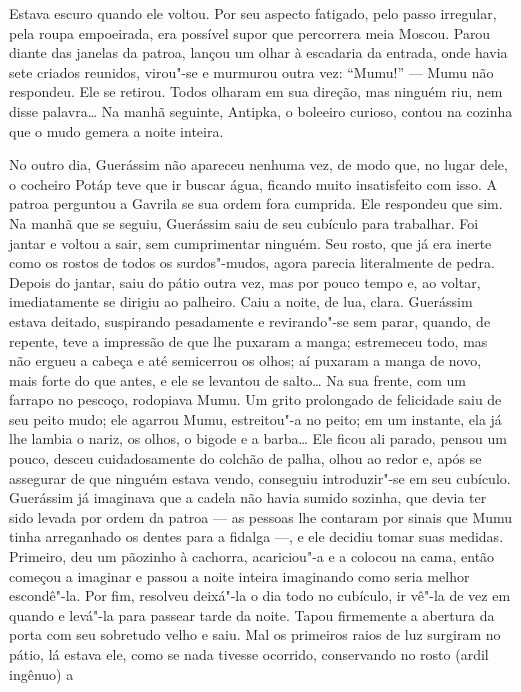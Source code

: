 Estava escuro quando ele voltou. Por seu aspecto fatigado, pelo passo
irregular, pela roupa empoeirada, era possível supor que percorrera meia
Moscou. Parou diante das janelas da patroa, lançou um olhar à escadaria
da entrada, onde havia sete criados reunidos, virou"-se e murmurou outra
vez: ``Mumu!'' --- Mumu não respondeu. Ele se retirou. Todos olharam em
sua direção, mas ninguém riu, nem disse palavra\ldots{} Na manhã seguinte,
Antipka, o boleeiro curioso, contou na cozinha que o mudo gemera a noite
inteira.

No outro dia, Guerássim não apareceu nenhuma vez, de modo que, no lugar
dele, o cocheiro Potáp teve que ir buscar água, ficando muito
insatisfeito com isso. A patroa perguntou a Gavrila se sua ordem fora
cumprida. Ele respondeu que sim. Na manhã que se seguiu, Guerássim saiu
de seu cubículo para trabalhar. Foi jantar e voltou a sair, sem
cumprimentar ninguém. Seu rosto, que já era inerte como os rostos de todos os
surdos"-mudos, agora parecia literalmente de pedra. Depois do jantar,
saiu do pátio outra vez, mas por pouco tempo e, ao voltar, imediatamente
se dirigiu ao palheiro. Caiu a noite, de lua, clara. Guerássim estava
deitado, suspirando pesadamente e revirando"-se sem parar, quando, de
repente, teve a impressão de que lhe puxaram a manga; estremeceu todo,
mas não ergueu a cabeça e até semicerrou os olhos; aí puxaram a manga de novo,
mais forte do que antes, e ele se levantou de salto\ldots{} Na sua frente,
com um farrapo no pescoço, rodopiava Mumu. Um grito prolongado de
felicidade saiu de seu peito mudo; ele agarrou Mumu, estreitou"-a no
peito; em um instante, ela já lhe lambia o nariz, os olhos, o bigode e a
barba\ldots{} Ele ficou ali parado, pensou um pouco, desceu cuidadosamente do
colchão de palha, olhou ao redor e, após se assegurar de que ninguém
estava vendo, conseguiu introduzir"-se em seu cubículo. Guerássim já
imaginava que a cadela não havia sumido sozinha, que devia ter sido
levada por ordem da patroa --- as pessoas lhe contaram por sinais que
Mumu tinha arreganhado os dentes para a fidalga ---, e ele decidiu tomar
suas medidas. Primeiro, deu um pãozinho à cachorra, acariciou"-a e a colocou
na cama, então começou a imaginar e passou a noite inteira imaginando
como seria melhor escondê"-la. Por fim, resolveu deixá"-la o dia todo no
cubículo, ir vê"-la de vez em quando e levá"-la para passear tarde da
noite. Tapou firmemente a abertura da porta com seu sobretudo velho e
saiu. Mal os primeiros raios de luz surgiram no pátio, lá estava ele,
como se nada tivesse ocorrido, conservando no rosto (ardil ingênuo) a
